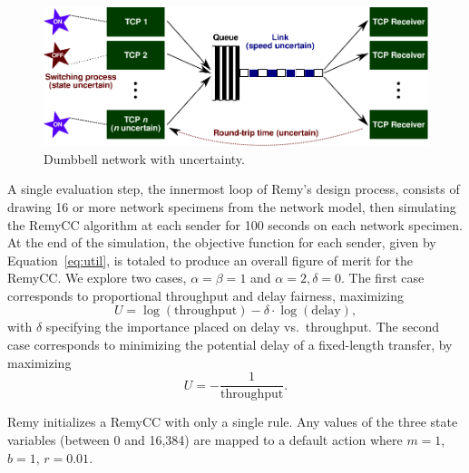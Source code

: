 
\begin{figure}
\vspace{\baselineskip}
\includegraphics[width=\columnwidth]{dumbbell.pdf}
\caption{Dumbbell network with uncertainty.}
\label{fig:dumbbell}

\end{figure}

A single evaluation step, the innermost loop of Remy's design process,
consists of drawing 16 or more network specimens from the network
model, then simulating the RemyCC algorithm at each sender for 100
seconds on each network specimen. At the end of the simulation, the
objective function for each sender, given by Equation~\ref{eq:util},
is totaled to produce an overall figure of merit for the RemyCC. We
explore two cases, $\alpha = \beta = 1$ and $\alpha=2, \delta =
0$. The first case corresponds to proportional throughput and delay
fairness, maximizing $$U = \log (\mbox{throughput}) - \delta \cdot
\log (\mbox{delay}),$$ with $\delta$ specifying the importance placed
on delay vs.~throughput. The second case corresponds to minimizing the
potential delay of a fixed-length transfer, by maximizing $$U =
-\frac{1}{\mbox{throughput}}.$$


Remy initializes a RemyCC with only a single rule. Any values of the
three state variables (between 0 and 16,384) are mapped to a default
action where $m = 1$, $b = 1$, $r = 0.01$.

